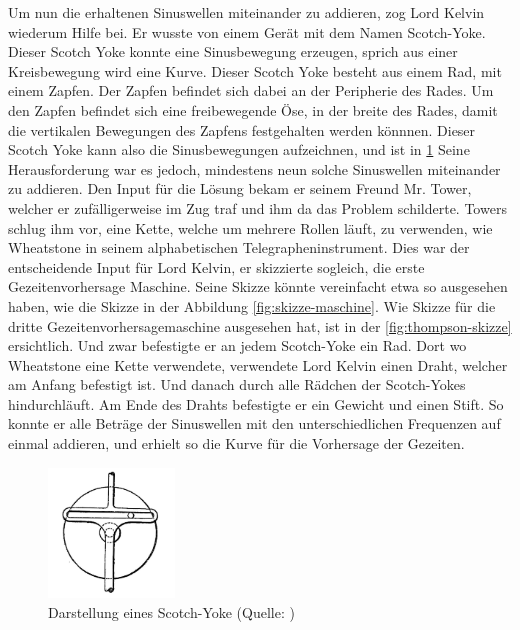 Um nun die erhaltenen Sinuswellen miteinander zu addieren, zog Lord Kelvin wiederum Hilfe bei.
Er wusste von einem Gerät mit dem Namen Scotch-Yoke.
Dieser Scotch Yoke konnte eine Sinusbewegung erzeugen, sprich aus einer Kreisbewegung wird eine Kurve.
Dieser Scotch Yoke besteht aus einem Rad, mit einem Zapfen.
Der Zapfen befindet sich dabei an der Peripherie des Rades.
Um den Zapfen befindet sich eine freibewegende Öse, in der breite des Rades, damit die vertikalen Bewegungen des Zapfens festgehalten werden könnnen.
Dieser Scotch Yoke kann also die Sinusbewegungen aufzeichnen, und ist in \ref{fig:scotch-yoke}
Seine Herausforderung war es jedoch, mindestens neun solche Sinuswellen miteinander zu addieren.
Den Input für die Lösung bekam er seinem Freund Mr. Tower, welcher er zufälligerweise im Zug traf und ihm da das Problem schilderte.
Towers schlug ihm vor, eine Kette, welche um mehrere Rollen läuft, zu verwenden, wie Wheatstone in seinem alphabetischen Telegrapheninstrument.
Dies war der entscheidende Input für Lord Kelvin, er skizzierte sogleich, die erste Gezeitenvorhersage Maschine. Seine Skizze könnte vereinfacht etwa so ausgesehen haben, wie die Skizze in der Abbildung \ref{fig:skizze-maschine}.
Wie Skizze für die dritte Gezeitenvorhersagemaschine ausgesehen hat, ist in der \ref{fig:thompson-skizze} ersichtlich. 
Und zwar befestigte er an jedem Scotch-Yoke ein Rad.
Dort wo Wheatstone eine Kette verwendete, verwendete Lord Kelvin einen Draht, welcher am Anfang befestigt ist.
Und danach durch alle Rädchen der Scotch-Yokes hindurchläuft.
Am Ende des Drahts befestigte er ein Gewicht und einen Stift.
So konnte er alle Beträge der Sinuswellen mit den unterschiedlichen Frequenzen auf einmal addieren, und erhielt so die Kurve für die Vorhersage der Gezeiten.

\begin{figure}
	\centering
	\includegraphics[width=0.3\textwidth]{"papers/gezeiten/Scotch Yoke"}
	\caption{Darstellung eines Scotch-Yoke (Quelle: \cite{gezeiten:Yoke})
	\label{fig:scotch-yoke}}
\end{figure}

